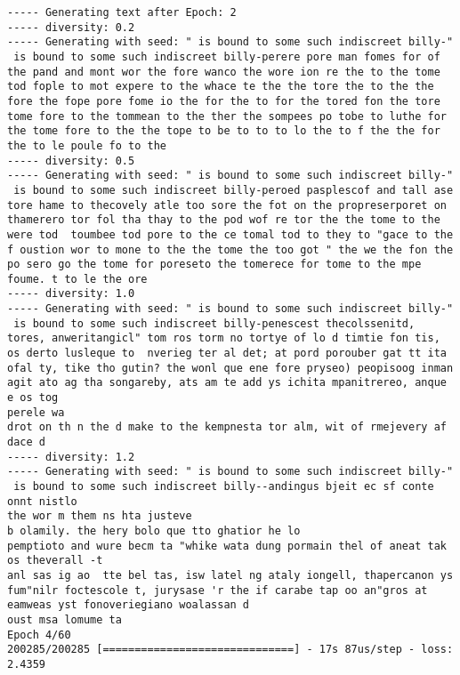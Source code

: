 \documentclass[11pt]{article}
\begin{document}
\begin{Verbatim}[commandchars=\\\{\}]
----- Generating text after Epoch: 2
----- diversity: 0.2
----- Generating with seed: " is bound to some such indiscreet billy-"
 is bound to some such indiscreet billy-perere pore man fomes for of the pand and mont wor the fore wanco the wore ion re the to the tome tod fople to mot expere to the whace te the the tore the to the the fore the fope pore fome io the for the to for the tored fon the tore tome fore to the tommean to the ther the sompees po tobe to luthe for the tome fore to the the tope to be to to to lo the to f the the for the to le poule fo to the 
----- diversity: 0.5
----- Generating with seed: " is bound to some such indiscreet billy-"
 is bound to some such indiscreet billy-peroed pasplescof and tall ase tore hame to thecovely atle too sore the fot on the propreserporet on thamerero tor fol tha thay to the pod wof re tor the the tome to the were tod  toumbee tod pore to the ce tomal tod to they to "gace to the f oustion wor to mone to the the tome the too got " the we the fon the po sero go the tome for poreseto the tomerece for tome to the mpe foume. t to le the ore
----- diversity: 1.0
----- Generating with seed: " is bound to some such indiscreet billy-"
 is bound to some such indiscreet billy-penescest thecolssenitd, tores, anweritangicl" tom ros torm no tortye of lo d timtie fon tis, os derto lusleque to  nverieg ter al det; at pord porouber gat tt ita ofal ty, tike tho gutin? the wonl que ene fore pryseo) peopisoog inman agit ato ag tha songareby, ats am te add ys ichita mpanitrereo, anque e os tog
perele wa
drot on th n the d make to the kempnesta tor alm, wit of rmejevery af dace d
----- diversity: 1.2
----- Generating with seed: " is bound to some such indiscreet billy-"
 is bound to some such indiscreet billy--andingus bjeit ec sf conte onnt nistlo
the wor m them ns hta justeve 
b olamily. the hery bolo que tto ghatior he lo
pemptioto and wure becm ta "whike wata dung pormain thel of aneat tak os theverall -t 
anl sas ig ao  tte bel tas, isw latel ng ataly iongell, thapercanon ys fum"nilr foctescole t, jurysase 'r the if carabe tap oo an"gros at eamweas yst fonoveriegiano woalassan d
oust msa lomume ta
Epoch 4/60
200285/200285 [==============================] - 17s 87us/step - loss: 2.4359


\end{Verbatim}
\end{document}
